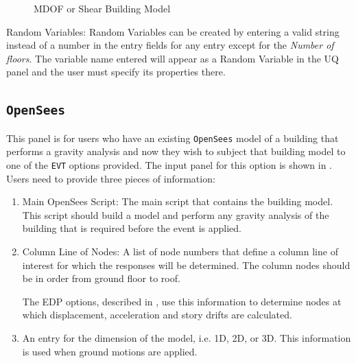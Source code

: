 \begin{figure}[!htbp]
  \caption{MDOF or Shear Building Model}
  \label{fig:mdof}
\end{figure}

Random Variables: Random Variables can be created by entering
a valid string instead of a number in the entry fields for any entry
except for the \emph{Number of floors}. The variable name entered will appear as
a Random Variable in the UQ panel and the user must specify its properties there.

\subsection{\texttt{OpenSees}}\label{sec:OpenSeesSIM}
This panel is for users who have an existing \texttt{OpenSees} model of a
building that performs a gravity analysis and now they wish to subject that
building model to one of the \texttt{EVT} options provided. The input panel
for this option is shown in . Users need to provide three pieces of information:
\begin{enumerate} 
\item Main OpenSees Script: The main script that contains the building
  model. This script should build a model and perform any gravity
  analysis of the building that is required before the event is
  applied.
\item Column Line of Nodes: A list of node numbers that define a column line of interest for which
  the responses will be determined. The column nodes should be in
  order from ground floor to roof. 
  
  The EDP options, described
  in , use this information to determine nodes at which
  displacement, acceleration and story drifts are calculated.
\item An entry for the dimension of the model, i.e. 1D, 2D, or 3D. This
  information is used when ground motions are applied.
\end{enumerate}

